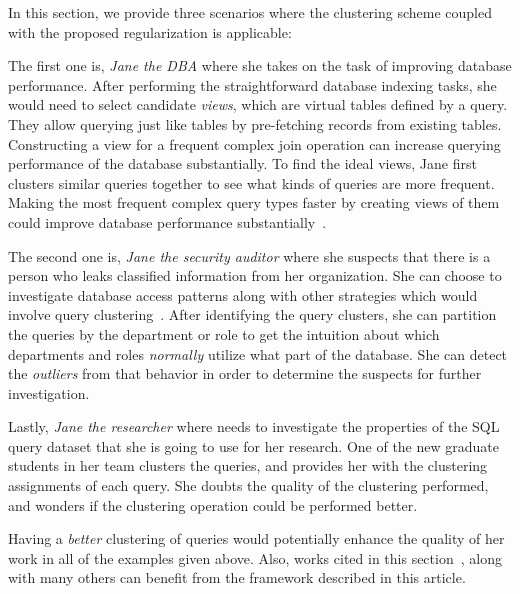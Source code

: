 In this section, we provide three scenarios where the clustering scheme coupled with the proposed regularization is applicable:

The first one is, \textit{Jane the DBA} where she takes on the task of improving database performance.
After performing the straightforward database indexing tasks, she would need to select candidate \textit{views}, which are virtual tables defined by a query.
They allow querying just like tables by pre-fetching records from existing tables. 
Constructing a view for a frequent complex join operation can increase querying performance of the database substantially.
To find the ideal views, Jane first clusters similar queries together to see what kinds of queries are more frequent.
Making the most frequent complex query types faster by creating views of them could improve database performance substantially~\cite{aouiche2006, aligon2014similarity}. 

The second one is, \textit{Jane the security auditor} where she suspects that there is a person who leaks classified information from her organization.
She can choose to investigate database access patterns along with other strategies which would involve query clustering~\cite{Sun2016}.
After identifying the query clusters, she can partition the queries by the department or role to get the intuition about which departments and roles \textit{normally} utilize what part of the database.
She can detect the \textit{outliers} from that behavior in order to determine the suspects for further investigation.

Lastly, \textit{Jane the researcher} where needs to investigate the properties of the SQL query dataset that she is going to use for her research.
One of the new graduate students in her team clusters the queries, and provides her with the clustering assignments of each query.
She doubts the quality of the clustering performed, and wonders if the clustering operation could be performed better.

Having a \textit{better} clustering of queries would potentially enhance the quality of her work in all of the examples given above.
Also, works cited in this section~\cite{aouiche2006, aligon2014similarity, Sun2016}, along with many others can benefit from the framework described in this article.
